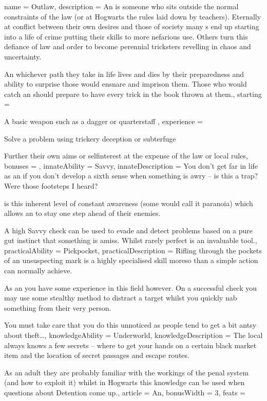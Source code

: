\archetype
{
	name = Outlaw,
	description = An \bname{} is someone who sits outside the normal constraints of the law (or \comma{} at Hogwarts\comma{} the rules laid down by teachers). Eternally at conflict between their own desires and those of society\comma{} many \bname{}s end up starting into a life of crime\comma{} putting their skills to more nefarious use. Others turn this defiance of law and order to become perennial tricksters\comma{} revelling in chaos and uncertainty. 

An \bname{}\comma{} whichever path they take in life\comma{} lives and dies by their preparedness and ability to surprise those would ensnare and imprison them. Those who would catch an \bname{} should prepare to have every trick in the book thrown at them.,
	starting = 
\item A basic weapon such as a dagger or quarterstaff
,
	experience = \item Solve a problem using trickery\comma{} deception or subterfuge
\item Further their own aims or self\minus{}interest at the expense of the law or local rules,
	bonuses = 
,
	innateAbility = Savvy,
	innateDescription = You don’t get far in life as an \bname{} if you don’t develop a sixth sense when something is awry – is this a trap? Were those footsteps I heard? 

 is this inherent level of constant awareness (some would call it paranoia)\comma{} which allows an \bname{} to stay one step ahead of their enemies. 

A high Savvy check can be used to evade and detect problems based on a pure gut instinct that something is amiss. Whilst rarely perfect\comma{}  is an invaluable tool.,
	practicalAbility = Pickpocket,
	practicalDescription = Rifling through the pockets of an unsuspecting mark is a highly specialised skill\comma{} moreso than a simple  action can normally achieve. 

As an \bname{}\comma{} you have some experience in this field however. On a successful  check you may use some stealthy method to distract a target whilst you quickly nab something from their very person. 

You must take care that you do this unnoticed\comma{} as people tend to get a bit antsy about theft…,
	knowledgeAbility = Underworld,
	knowledgeDescription = The local \bname{} always knows a few secrets – where to get your hands on a certain black market item\comma{} and the location of secret passages and escape routes. 

As an adult\comma{} they are probably familiar with the workings of the penal system (and how to exploit it)\comma{} whilst in Hogwarts\comma{} this knowledge can be used when questions about Detention come up.,
	article = An,
	bonusWidth = 3, feats = \OutlawFeats
}


